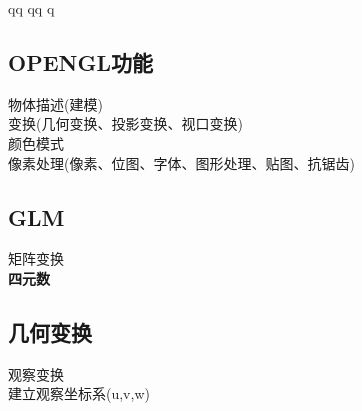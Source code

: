 qq	qq	q                                                                                                                                                                                                                                                                                      \documentclass{article}
\begin{document}
\begin{CJK}{UTF8}{gbsn}
	\subsection{OPENGL功能}
	物体描述(建模)\\
	变换(几何变换、投影变换、视口变换)\\
	颜色模式\\
	像素处理(像素、位图、字体、图形处理、贴图、抗锯齿)\\
	\subsection{GLM}
	矩阵变换\\
	\textbf{四元数}\\
	\subsection{几何变换}
	观察变换\\
	建立观察坐标系(u,v,w)\\
	
	
\end{CJK}
\end{document}
